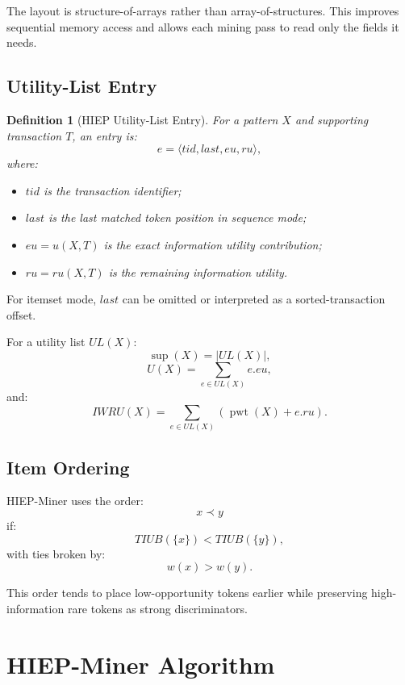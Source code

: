 \documentclass[11pt,a4paper]{article}
\newtheorem{definition}{Definition}
\newcommand{\supp}{\operatorname{sup}}
\newcommand{\pwt}{\operatorname{pwt}}
\begin{document}
The layout is structure-of-arrays rather than array-of-structures. This improves sequential memory access and allows each mining pass to read only the fields it needs.

\subsection{Utility-List Entry}

\begin{definition}[HIEP Utility-List Entry]
For a pattern \(X\) and supporting transaction \(T\), an entry is:
\[
e=\langle tid,last,eu,ru\rangle,
\]
where:
\begin{itemize}
    \item \(tid\) is the transaction identifier;
    \item \(last\) is the last matched token position in sequence mode;
    \item \(eu=u(X,T)\) is the exact information utility contribution;
    \item \(ru=ru(X,T)\) is the remaining information utility.
\end{itemize}
\end{definition}

For itemset mode, \(last\) can be omitted or interpreted as a sorted-transaction offset.

For a utility list \(UL(X)\):
\[
\supp(X)=|UL(X)|,
\]
\[
U(X)=\sum_{e\in UL(X)}e.eu,
\]
and:
\[
IWRU(X)=\sum_{e\in UL(X)}\left(\pwt(X)+e.ru\right).
\]

\subsection{Item Ordering}

HIEP-Miner uses the order:
\[
x\prec y
\]
if:
\[
TIUB(\{x\})<TIUB(\{y\}),
\]
with ties broken by:
\[
w(x)>w(y).
\]

This order tends to place low-opportunity tokens earlier while preserving high-information rare tokens as strong discriminators.

\section{HIEP-Miner Algorithm}
\end{document}
